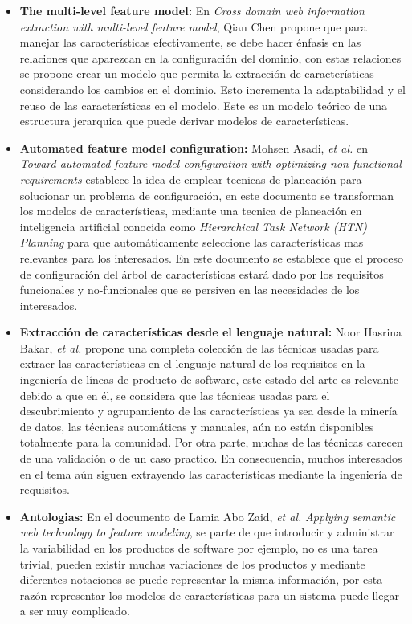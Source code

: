 \begin{itemize}
	\item{\textbf{The multi-level feature model:}}
	En \textit{Cross domain web information extraction with multi-level feature model}\cite{Chen2014a}, Qian Chen  propone que para manejar las características efectivamente, se debe hacer énfasis en las relaciones que aparezcan en la configuración del dominio, con estas relaciones  se propone crear un modelo que permita la extracción de características considerando los cambios en el dominio. Esto incrementa la adaptabilidad y el reuso de las características en el modelo. Este es un modelo teórico de una estructura jerarquica que puede derivar modelos de características.
	\item {\textbf{Automated feature model configuration:}}
	Mohsen Asadi, \textit{et al.} en \textit{Toward automated feature model configuration with optimizing non-functional requirements}\cite{Asadi2014} establece la idea de emplear tecnicas de planeación para solucionar un problema de configuración, en este documento se transforman los modelos de características, mediante una tecnica de planeación en  inteligencia artificial conocida como \textit{Hierarchical Task Network (HTN) Planning} para que automáticamente seleccione las características mas relevantes para los interesados. En este documento se establece que el proceso de configuración del árbol de características estará dado por los requisitos funcionales y no-funcionales que se persiven en las necesidades de los interesados.
	\item {\textbf{Extracción de características desde el lenguaje natural:}}
	Noor Hasrina Bakar, \textit{et al.} propone una completa colección de las técnicas usadas para extraer las características en el lenguaje natural de los requisitos en la ingeniería de líneas de producto de software\cite{Bakar2015a}, este estado del arte es relevante debido a que en él, se considera que las técnicas usadas para el descubrimiento y agrupamiento de las características ya sea desde la minería de datos, las técnicas automáticas y manuales, aún no están disponibles totalmente para la comunidad. Por otra parte, muchas de las técnicas carecen de una validación o de un caso practico. En consecuencia, muchos interesados en el tema aún siguen extrayendo las características mediante la ingeniería de requisitos.
	\item {\textbf{Antologias:}}
	En el documento de Lamia Abo Zaid, \textit{et al.} \textit{Applying semantic web technology to feature modeling}, se parte de que introducir y administrar la variabilidad en los productos de software por ejemplo, no es una tarea trivial, pueden existir muchas variaciones de los productos y mediante diferentes notaciones se puede representar la misma información, por esta razón representar los modelos de características para un sistema puede llegar a ser muy complicado.

\end{itemize}
